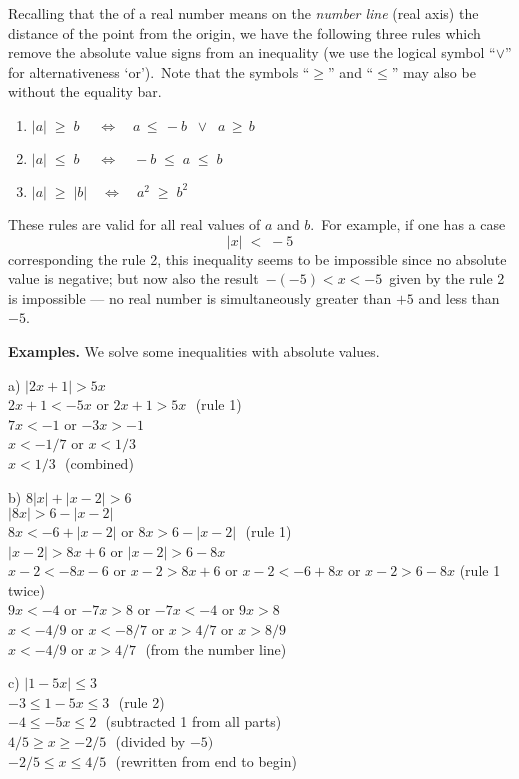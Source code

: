 \documentclass[12pt]{article}
\theoremstyle{definition}
\begin{document}

Recalling that the  of a real number means on the {\em number line} (real axis) the distance of the point from the origin, we have the following three rules which remove the absolute value signs from an inequality (we use the logical symbol ``$\lor$'' for alternativeness `or').\, Note that the symbols ``$\ge$'' and ``$\le$'' may also be without the equality bar.
\begin{enumerate}
\item \;$|a| \;\ge\; b\; \quad \Leftrightarrow \quad a \,\le\, -b \;\;\lor\;\;a \,\ge\, b$
\item \;$|a| \;\le\; b\; \quad \Leftrightarrow \quad -b \;\le\; a \;\le\; b$
\item \;$|a| \;\ge\; |b|  \quad \Leftrightarrow \quad a^2 \;\ge\; b^2$
\end{enumerate}

These rules are valid for all real values of $a$ and $b$.\, For example, if one has a case 
$$|x| \;<\; -5$$
corresponding the rule 2, this inequality seems to be impossible since no absolute value is negative; but now also the result\, $-(-5) < x < -5$\, given by the rule 2 is impossible --- no real number is simultaneously greater than $+5$ and less than $-5$.

\textbf{Examples.}\; We solve some inequalities with absolute values.

a)\; $|2x\!+\!1| > 5x$\\
$2x\!+\!1 < -5x$\; or\; $2x\!+\!1 > 5x$\,\, (rule 1)\\
$7x < -1$\; or\; $-3x > -1$\\
$x < -1/7$\; or\; $x < 1/3$\\
$x < 1/3$\,\, (combined)

b)\; $8|x|+|x\!-\!2| > 6$\\
$|8x| > 6-|x\!-\!2|$\\
$8x < -6+|x\!-\!2|$\; or\; $8x > 6-|x\!-\!2|$\,\, (rule 1)\\
$|x\!-\!2| > 8x\!+\!6$\; or\; $|x\!-\!2| > 6\!-\!8x$\\
$x\!-\!2 < -8x\!-\!6$\; or\; $x\!-\!2 > 8x\!+\!6$\; or\; $x\!-\!2 < -6\!+\!8x$\; or\; $x\!-\!2 > 6\!-\!8x$\; (rule 1 twice)\\
$9x < -4$\; or\; $-7x > 8$\; or\; $-7x  < -4$\; or\; $9x > 8$\\
$x < -4/9$\; or\; $x < -8/7$\; or\; $x > 4/7$\; or\; $x > 8/9$\\
$x < -4/9$\; or\; $x > 4/7$\,\, (from the number line)

c)\; $|1\!-\!5x| \le 3$\\
$-3 \le 1\!-\!5x \le 3$\,\, (rule 2)\\
$-4 \le -5x \le 2$\,\, (subtracted 1 from all parts)\\
$4/5 \ge x \ge -2/5$\,\, (divided by $-5)$\\
$-2/5 \le x \le 4/5$\,\, (rewritten from end to begin)
\end{document}
